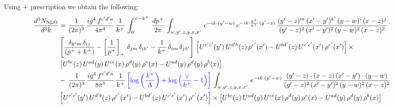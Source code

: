 \documentclass[9pt]{article}
\numberwithin{equation}{section}
\begin{document}
Using $+$ prescription we obtain the following:
\begin{align}
    \frac{d^{3}N_{\rm NLO}}{d^{3}k} & = \frac{1}{(2\pi)^{3}}\, \frac{ig^{4}\,f^{c'd'a}}{4\pi^{4}}\, \frac{1}{k^{+}}\,\int_{0}^{\vee-k^{+}}\, \frac{dp^{+}}{2\pi}\, \int_{w,y',z,y,x,x'}\, e^{-ik\cdot (y'-w)}\, e^{-ik\cdot \frac{p^{+}}{k^{+}}\,(y'-z)}\,\frac{(y'-z)^{m}\,(x'-y')^{k'}\,(y-w)^{i}\,(x-z)^{j}}{(y'-z)^{2}\,(x'-y')^{2}\,(y-w)^{2}\,(x-z)^{2}}\notag \\ & \left[\frac{\delta_{k'm}\,\delta_{ij}}{(p^{+}+k^{+})}-\left[\frac{1}{p^{+}}\right]_{+}\,\delta_{jm}\,\delta_{ik'}-\frac{1}{k^{+}}\, \delta_{im}\, \delta_{jk'}\right]\, \left[U^{e'c'}(y')\,U^{d'b}(z)\,\rho^{e'}(x')-U^{bd'}(z)\,U^{c'e'}(x')\,\rho^{e'}(x')\right]\times\notag \\ &  \left[U^{bc}(z)\,U^{ad}(y)\,U^{ce}(x)\,\rho^{d}(y)\,\rho^{e}(x)-U^{ad}(y)\,\rho^{d}(y)\,\rho^{b}(x)\right]\notag \\ &  -\,\frac{1}{(2\pi)^{3}}\, \frac{ig^{4}\,f^{c'd'a}}{8\pi^{5}}\, \frac{1}{k^{+}}\,{\color{blue}\left[\log{\left(\frac{k^{+}}{\Lambda}\right)}+\log{\left(\frac{\vee}{k^{+}}-1\right)}\right]}\, \int_{w,y',z,y,x,x'}\, e^{-ik\cdot (y'-w)}\,\frac{(y'-z)\cdot (x-z)\,(x'-y')\cdot (y-w)}{(y'-z)^{2}\,(x'-y')^{2}\,(y-w)^{2}\,(x-z)^{2}}\notag \\ & \left[U^{e'c'}(y')\,U^{d'b}(z)\,\rho^{e'}(x')-U^{bd'}(z)\,U^{c'e'}(x')\,\rho^{e'}(x')\right]\times  \left[U^{bc}(z)\,U^{ad}(y)\,U^{ce}(x)\,\rho^{d}(y)\,\rho^{e}(x)-U^{ad}(y)\,\rho^{d}(y)\,\rho^{b}(x)\right]
\end{align}
\end{document}
